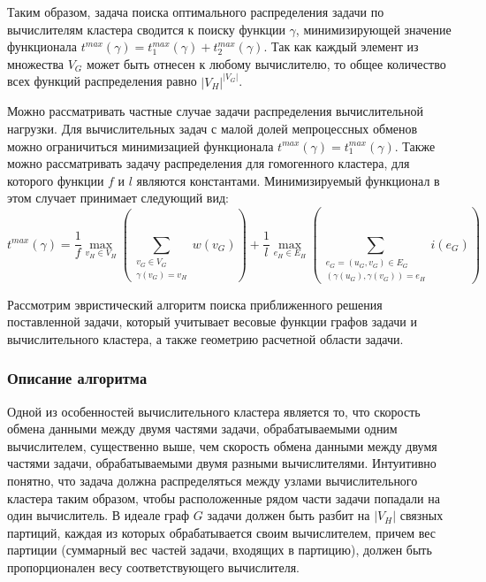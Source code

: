 Таким образом, задача поиска оптимального распределения задачи по вычислителям кластера сводится к поиску функции $\gamma$, минимизирующей значение функционала $t^{max}(\gamma) = t_1^{max}(\gamma) + t_2^{max}(\gamma)$.
Так как каждый элемент из множества $V_G$ может быть отнесен к любому вычислителю, то общее количество всех функций распределения равно $|V_H|^{|V_G|}$.

Можно рассматривать частные случае задачи распределения вычислительной нагрузки.
Для вычислительных задач с малой долей мепроцессных обменов можно ограничиться минимизацией функционала $t^{max}(\gamma) = t_1^{max}(\gamma)$.
Также можно рассматривать задачу распределения для гомогенного кластера\label{term:cluster_gomo}, для которого функции $f$ и $l$ являются константами.
Минимизируемый функционал в этом случает принимает следующий вид:
\begin{equation}
	t^{max}(\gamma) =
		\frac{1}{f} \max_{v_H \in V_H}{\left( \sum_{\substack{v_G \in V_G \\ \gamma(v_G) = v_H}}{w(v_G)} \right)} + 
		\frac{1}{l} \max_{e_H \in E_H}{\left( \sum_{\substack{e_G = (u_G, v_G) \in E_G \\ (\gamma(u_G), \gamma(v_G)) = e_H}}{i(e_G)} \right)}
\end{equation}

Рассмотрим эвристический алгоритм поиска приближенного решения поставленной задачи, который учитывает весовые функции графов задачи и вычислительного кластера, а также геометрию расчетной области задачи.

\subsubsection{Описание алгоритма}

Одной из особенностей вычислительного кластера является то, что скорость обмена данными между двумя частями задачи, обрабатываемыми одним вычислителем, существенно выше, чем скорость обмена данными между двумя частями задачи, обрабатываемыми двумя разными вычислителями.
Интуитивно понятно, что задача должна распределяться между узлами вычислительного кластера таким образом, чтобы расположенные рядом части задачи попадали на один вычислитель.
В идеале граф $G$ задачи должен быть разбит на $|V_H|$ связных партиций, каждая из которых обрабатывается своим вычислителем, причем вес партиции (суммарный вес частей задачи, входящих в партицию), должен быть пропорционален весу соответствующего вычислителя.

